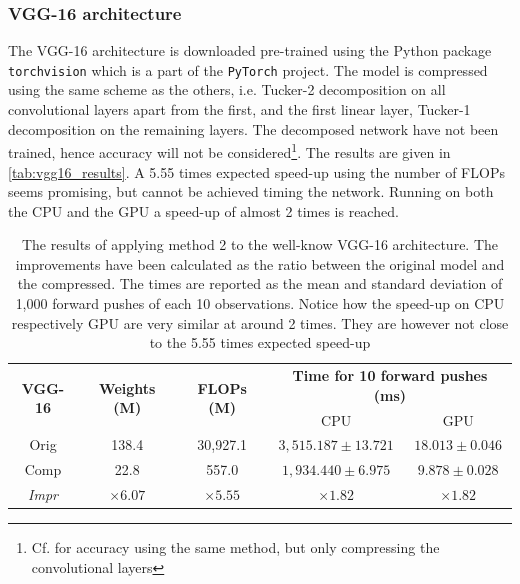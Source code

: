 \subsubsection{VGG-16 architecture}
The VGG-16 architecture is downloaded pre-trained using the Python package \texttt{torchvision} which is a part of the \texttt{PyTorch} project. The model is compressed using the same scheme as the others, i.e. Tucker-2 decomposition on all convolutional layers apart from the first, and the first linear layer, Tucker-1 decomposition on the remaining layers. The decomposed network have not been trained, hence accuracy will not be considered\footnote{Cf. \cite{Kim2016} for accuracy using the same method, but only compressing the convolutional layers}. The results are given in \autoref{tab:vgg16_results}. A 5.55 times expected speed-up using the number of FLOPs seems promising, but cannot be achieved timing the network. Running on both the CPU and the GPU a speed-up of almost 2 times is reached.
\begin{table}[H]
\centering
\captionsetup{width=.95\linewidth}
\caption{The results of applying method 2 to the well-know VGG-16 architecture. The improvements have been calculated as the ratio between the original model and the compressed. The times are reported as the mean and standard deviation of 1,000 forward pushes of each 10 observations. Notice how the speed-up on CPU respectively GPU are very similar at around 2 times. They are however not close to the 5.55 times expected speed-up}
\label{tab:vgg16_results}
\begin{tabular}{c|cccc}
\multirow{2}{*}{\textbf{VGG-16}} & \multirow{2}{*}{\textbf{Weights (M)}} & \multirow{2}{*}{\textbf{FLOPs (M)}} & \multicolumn{2}{c}{\textbf{Time for 10 forward pushes (ms)}} \\
                                 &                                       &                                     & CPU                          & GPU                        \\ \hline
Orig                             & 138.4                                 & 30,927.1                            & $3,515.187 \pm 13.721 $        & $18.013 \pm 0.046 $        \\
Comp                             & 22.8                                  & 557.0                               & $1,934.440 \pm 6.975$       & $ 9.878 \pm 0.028 $        \\
\textit{Impr}                    & $ \times 6.07 $                       & $\times 5.55$                       & $\times 1.82 $               & $ \times 1.82 $           
\end{tabular}
\end{table}
